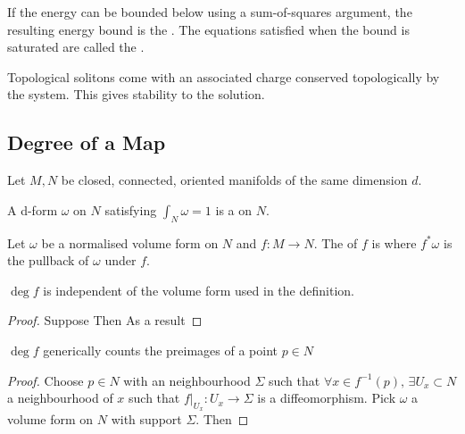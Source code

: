 \documentclass{article}
\begin{document}
\begin{definition}
If the energy can be bounded below using a sum-of-squares argument, the resulting energy bound is the . The equations satisfied when the bound is saturated are called the .
\end{definition}

\begin{definition}
Topological solitons come with an associated charge conserved topologically by the system. This gives stability to the solution. 
\end{definition}

\subsection{Degree of a Map}
Let $M,N$ be closed, connected, oriented manifolds of the same dimension $d$.

\begin{definition}
A d-form $\omega$ on $N$ satisfying $\int_N \omega = 1$ is a  on $N$.
\end{definition}

\begin{definition}[Degree]
Let $\omega$ be a normalised volume form on $N$ and $f:M \to N$. The  of $f$ is 
where $f^\ast \omega$ is the pullback of $\omega$ under $f$. 
\end{definition}

\begin{prop}
$\deg f$ is independent of the volume form used in the definition. 
\end{prop}
\begin{proof}
Suppose 
Then 
As a result 
\end{proof}

\begin{prop}
$\deg f$ generically counts the preimages of a point $p\in N$
\end{prop}
\begin{proof}
Choose $p\in N$ with an neighbourhood $\Sigma$ such that $\forall x \in f^{-1}(p), \, \exists U_x \subset N$ a neighbourhood of $x$ such that $f\rvert_{U_x} : U_x \to \Sigma$ is a diffeomorphism. Pick $\omega$ a volume form on $N$ with support $\Sigma$. Then 
\end{proof}
\end{document}
